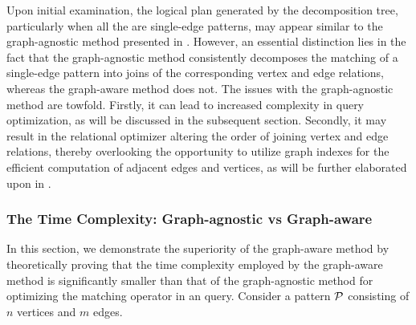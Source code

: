 \begin{example}
\end{example}

Upon initial examination, the logical plan generated by the decomposition tree, particularly when all the \mmcs are single-edge patterns,
may appear similar to the graph-agnostic method presented in . However, an essential distinction lies in the fact that the graph-agnostic method consistently decomposes the matching of a single-edge pattern into joins of the corresponding vertex and edge relations, whereas the graph-aware method does not. The issues with the graph-agnostic method are towfold. Firstly, it can lead to increased complexity in query optimization, as will be discussed in the subsequent section. Secondly, it may result in the relational optimizer altering the order of joining vertex and edge relations, thereby overlooking the opportunity to utilize graph indexes for the efficient computation of adjacent edges and vertices, as will be further elaborated upon in .

\subsubsection{The Time Complexity: Graph-agnostic vs Graph-aware}
\label{sec:compare-search-space}

In this section, we demonstrate the superiority of the graph-aware method by theoretically proving that the time complexity employed by the graph-aware method is significantly smaller than that of the graph-agnostic method for optimizing the matching operator in an \spjm query.
Consider a pattern $\mathcal{P}$ consisting of $n$ vertices and $m$ edges.

